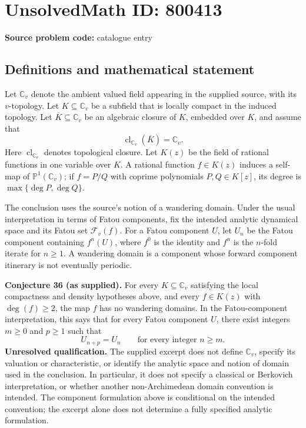 \documentclass[11pt]{article}
\begin{document}
\section*{UnsolvedMath ID: 800413}
\textbf{Source problem code:} catalogue entry
\subsection{Definitions and mathematical statement}
Let \(\mathbb C_v\) denote the ambient valued field appearing in the supplied source, with its \(v\)-topology. Let \(K\subseteq\mathbb C_v\) be a subfield that is locally compact in the induced topology. Let \(\overline K\subseteq\mathbb C_v\) be an algebraic closure of \(K\), embedded over \(K\), and assume that
\[
\operatorname{cl}_{\mathbb C_v}(\overline K)=\mathbb C_v.
\]
Here \(\operatorname{cl}_{\mathbb C_v}\) denotes topological closure. Let \(K(z)\) be the field of rational functions in one variable over \(K\). A rational function \(f\in K(z)\) induces a self-map of \(\mathbb P^1(\mathbb C_v)\); if \(f=P/Q\) with coprime polynomials \(P,Q\in K[z]\), its degree is \(\max\{\deg P,\deg Q\}\).

The conclusion uses the source's notion of a wandering domain. Under the usual interpretation in terms of Fatou components, fix the intended analytic dynamical space and its Fatou set \(\mathcal F_v(f)\). For a Fatou component \(U\), let \(U_n\) be the Fatou component containing \(f^n(U)\), where \(f^0\) is the identity and \(f^n\) is the \(n\)-fold iterate for \(n\geq1\). A wandering domain is a component whose forward component itinerary is not eventually periodic.

\textbf{Conjecture 36 (as supplied).} For every \(K\subseteq\mathbb C_v\) satisfying the local compactness and density hypotheses above, and every \(f\in K(z)\) with \(\deg(f)\geq2\), the map \(f\) has no wandering domains. In the Fatou-component interpretation, this says that for every Fatou component \(U\), there exist integers \(m\geq0\) and \(p\geq1\) such that
\[
U_{n+p}=U_n\qquad\text{for every integer }n\geq m.
\]
\textbf{Unresolved qualification.} The supplied excerpt does not define \(\mathbb C_v\), specify its valuation or characteristic, or identify the analytic space and notion of domain used in the conclusion. In particular, it does not specify a classical or Berkovich interpretation, or whether another non-Archimedean domain convention is intended. The component formulation above is conditional on the intended convention; the excerpt alone does not determine a fully specified analytic formulation.
\end{document}
